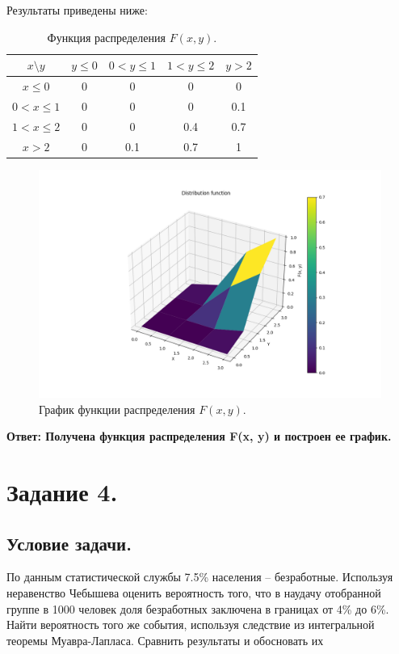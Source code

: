 \documentclass[a4paper, 12pt]{article}
\begin{document}
    Результаты приведены ниже:
    \begin{table}[h]
        \centering
        \begin{tabular}{|c|c|c|c|c|}
        \hline
        $x \text{\textbackslash} y$ & $y\leq0$ & $0<y\leq1$ & $1<y\leq2$ & $y>2$ \\
        \hline
        $x\leq0$ & 0 & 0 & 0 & 0\\
        \hline
        $0<x\leq1$ & 0 & 0 & 0 & 0.1\\
        \hline
        $1<x\leq2$ & 0 & 0 & 0.4 & 0.7\\
        \hline
        $x>2$ & 0 & 0.1 & 0.7 & 1\\
        \hline
        \end{tabular}
        \caption{Функция распределения $F(x,y)$.}
        \label{tab:F_x}
    \end{table}
    \begin{figure}[H]
        \centering
        \includegraphics[scale=0.5]{disf.png}
        \captionsetup{skip=0pt}
        \caption{График функции распределения $F(x,y)$.}
        \label{fig:F_xg}
    \end{figure}


    \textbf{Ответ: Получена функция распределения F(x, y) и построен ее график.}


    \section{Задание 4.}
    \subsection{Условие задачи.}
    По данным статистической службы 7.5\% населения -- безработные.
    Используя неравенство Чебышева оценить вероятность того, что в
    наудачу отобранной группе в 1000 человек доля безработных заключена
    в границах от 4\% до 6\%. Найти вероятность того же события, используя
    следствие из интегральной теоремы Муавра-Лапласа. Сравнить
    результаты и обосновать их
\end{document}

